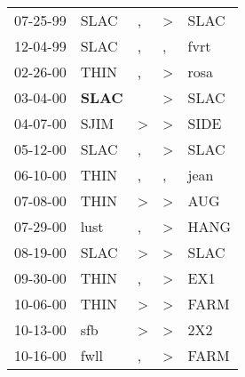 \begin{supertabular}{p{0.07\textwidth}p{0.06\textwidth}p{0.02\textwidth}p{0.02\textwidth}p{0.06\textwidth}}
          07-25-99\textsuperscript{} &           SLAC\textsuperscript{} &                , &     \textgreater &           SLAC\textsuperscript{} \\
          12-04-99\textsuperscript{} &           SLAC\textsuperscript{} &                , &                , &           fvrt\textsuperscript{} \\
          02-26-00\textsuperscript{} &           THIN\textsuperscript{} &                , &     \textgreater &           rosa\textsuperscript{} \\
          03-04-00\textsuperscript{} &  \textbf{SLAC\textsuperscript{}} &                  &     \textgreater &           SLAC\textsuperscript{} \\
          04-07-00\textsuperscript{} &           SJIM\textsuperscript{} &     \textgreater &     \textgreater &           SIDE\textsuperscript{} \\
          05-12-00\textsuperscript{} &           SLAC\textsuperscript{} &                , &     \textgreater &           SLAC\textsuperscript{} \\
          06-10-00\textsuperscript{} &           THIN\textsuperscript{} &                , &                , &           jean\textsuperscript{} \\
          07-08-00\textsuperscript{} &           THIN\textsuperscript{} &     \textgreater &     \textgreater &            AUG\textsuperscript{} \\
          07-29-00\textsuperscript{} &           lust\textsuperscript{} &                , &     \textgreater &           HANG\textsuperscript{} \\
          08-19-00\textsuperscript{} &           SLAC\textsuperscript{} &     \textgreater &     \textgreater &           SLAC\textsuperscript{} \\
          09-30-00\textsuperscript{} &           THIN\textsuperscript{} &                , &     \textgreater &            EX1\textsuperscript{} \\
          10-06-00\textsuperscript{} &           THIN\textsuperscript{} &     \textgreater &     \textgreater &           FARM\textsuperscript{} \\
          10-13-00\textsuperscript{} &            sfb\textsuperscript{} &     \textgreater &     \textgreater &            2X2\textsuperscript{} \\
          10-16-00\textsuperscript{} &           fwll\textsuperscript{} &                , &     \textgreater &           FARM\textsuperscript{} \\

\end{supertabular}

